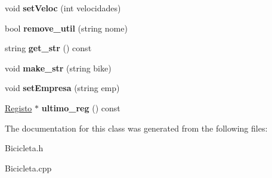 \begin{DoxyCompactItemize}
\item 
\hypertarget{class_bicicleta_aef781f0496eab00a16c354d52f9f1686}{void {\bfseries set\+Veloc} (int velocidades)}\label{class_bicicleta_aef781f0496eab00a16c354d52f9f1686}

\item 
\hypertarget{class_bicicleta_a791cdbbf5016ea3a0229915b84a52a04}{bool {\bfseries remove\+\_\+util} (string nome)}\label{class_bicicleta_a791cdbbf5016ea3a0229915b84a52a04}

\item 
\hypertarget{class_bicicleta_a570101dbac9300d107433c52ae698915}{string {\bfseries get\+\_\+str} () const }\label{class_bicicleta_a570101dbac9300d107433c52ae698915}

\item 
\hypertarget{class_bicicleta_aff75cc7f6d1a554a8b7c663834115575}{void {\bfseries make\+\_\+str} (string bike)}\label{class_bicicleta_aff75cc7f6d1a554a8b7c663834115575}

\item 
\hypertarget{class_bicicleta_ae48de57881e09ac89a84558c79894640}{void {\bfseries set\+Empresa} (string emp)}\label{class_bicicleta_ae48de57881e09ac89a84558c79894640}

\item 
\hypertarget{class_bicicleta_a0f6d8c8efea7822160a397ef040438d1}{\hyperlink{class_registo}{Registo} $\ast$ {\bfseries ultimo\+\_\+reg} () const }\label{class_bicicleta_a0f6d8c8efea7822160a397ef040438d1}

\end{DoxyCompactItemize}


The documentation for this class was generated from the following files\+:\begin{DoxyCompactItemize}
\item 
Bicicleta.\+h\item 
Bicicleta.\+cpp\end{DoxyCompactItemize}
